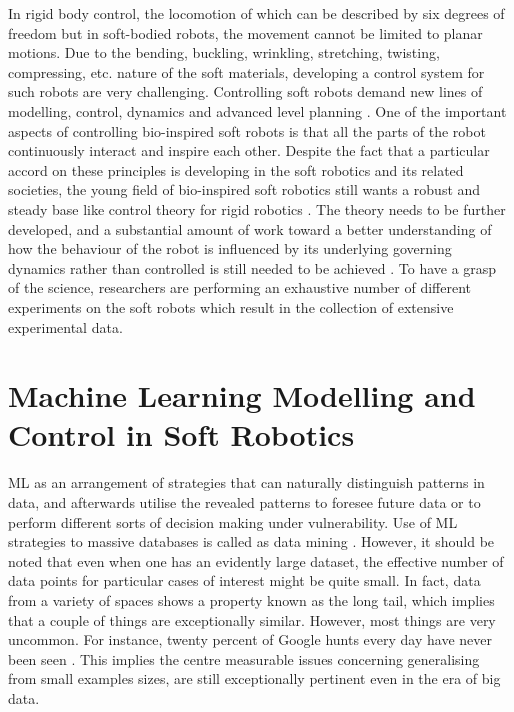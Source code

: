 In rigid body control, the locomotion of which can be described by
six degrees of freedom but in soft-bodied robots, the movement cannot
be limited to planar motions. Due to the bending, buckling, wrinkling,
stretching, twisting, compressing, etc. nature of the soft materials,
developing a control system for such robots are very challenging. Controlling
soft robots demand new lines of modelling, control, dynamics
and advanced level planning \citep{rus2015}. One of the important aspects of
controlling bio-inspired soft robots is that all the parts of the robot
continuously interact and inspire each other. Despite the fact that a particular accord on these principles is developing in the soft robotics and
its related societies, the young field of bio-inspired soft robotics still
wants a robust and steady base like control theory for rigid robotics \citep{Pfeifer2007}. The theory needs to be further developed, and a substantial amount
of work toward a better understanding of how the behaviour of the
robot is influenced by its underlying governing dynamics rather than
controlled is still needed to be achieved \citep{Pfeifer2012}. To have a grasp of the
science, researchers are performing an exhaustive number of different
experiments on the soft robots which result in the collection of
extensive experimental data.

\section{Machine Learning Modelling and Control in Soft Robotics}

\ac{ML} as an arrangement of strategies that can naturally
distinguish patterns in data, and afterwards utilise the revealed
patterns to foresee future data or to perform different sorts of decision
making under vulnerability. Use of \ac{ML} strategies to
massive databases is called as data mining \citep{Alpaydin2020}. However, it should be
noted that even when one has an evidently large dataset, the effective
number of data points for particular cases of interest might be quite
small. In fact, data from a variety of spaces shows a property known
as the long tail, which implies that a couple of things are exceptionally
similar. However, most things are very uncommon. For instance,
twenty percent of Google hunts every day have never been seen \citep{Murphy2012}.
This implies the centre measurable issues concerning generalising
from small examples sizes, are still exceptionally pertinent even in the
era of big data.

